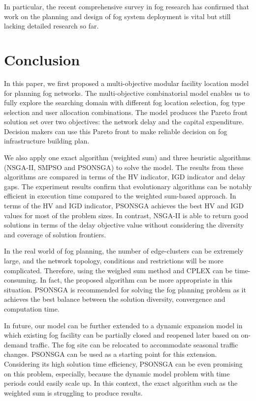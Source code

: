 \documentclass[10pt,journal,compsoc]{IEEEtran}
\begin{document}

In particular, the recent comprehensive survey \cite{mouradian2017comprehensive} in fog research has confirmed that work on the planning and design of fog system deployment is vital but still lacking detailed research so far.

\section{Conclusion}\label{conclu}
In this paper, we first proposed a multi-objective modular facility location model for planning fog networks. The multi-objective combinatorial model enables us to fully explore the searching domain with different fog location selection, fog type selection and user allocation combinations. The model produces the Pareto front solution set over two objectives: the network delay and the capital expenditure. Decision makers can use this Pareto front to make reliable decision on fog infrastructure building plan. 

We also apply one exact algorithm (weighted sum) and three heuristic algorithms (NSGA-II, SMPSO and PSONSGA) to solve the model. The results from these algorithms are compared in terms of the HV indicator, IGD indicator and delay gaps. The experiment results confirm that evolutionary algorithms can be notably efficient in execution time compared to the weighted sum-based approach. In terms of the HV and IGD indicator, PSONSGA achieves the best HV and IGD values for most of the problem sizes. In contrast, NSGA-II is able to return good solutions in terms of the delay objective value without considering the diversity and coverage of solution frontiers.

In the real world of fog planning, the number of edge-clusters can be extremely large, and the network topology, conditions and restrictions will be more complicated. Therefore, using the weighed sum method and CPLEX can be time-consuming. In fact, the proposed algorithm can be more appropriate in this situation. PSONSGA is recommended for solving the fog planning problem as it achieves the best balance between the solution diversity, convergence and computation time.

In future, our model can be further extended to a dynamic expansion model in which existing fog facility can be partially closed and reopened later based on on-demand traffic. The fog site can be relocated to accommodate seasonal traffic changes. PSONSGA can be used as a starting point for this extension. Considering its high solution time efficiency, PSONSGA can be even promising on this problem, especially, because the dynamic model problem with time periods could easily scale up. In this context, the exact algorithm such as the weighted sum is struggling to produce results.
\end{document}
